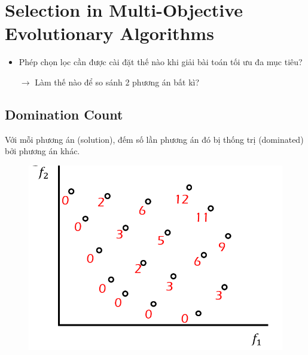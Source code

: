 \documentclass{book}
\begin{document}
\section{Selection in Multi-Objective Evolutionary Algorithms}

\begin{itemize}
    \item Phép chọn lọc cần được cài đặt thế nào khi giải bài toán tối ưu đa mục tiêu?
    \item[$\rightarrow$] Làm thế nào để so sánh 2 phương án bất kì?
\end{itemize}

\subsection{Domination Count}
Với mỗi phương án (solution), đếm số lần phương án đó bị thống trị (dominated) bởi phương án khác.

\begin{figure}[H]
    \centering
    \includegraphics[width=0.5\linewidth]{images/GA-7-8_30.png}
\end{figure}
\end{document}
